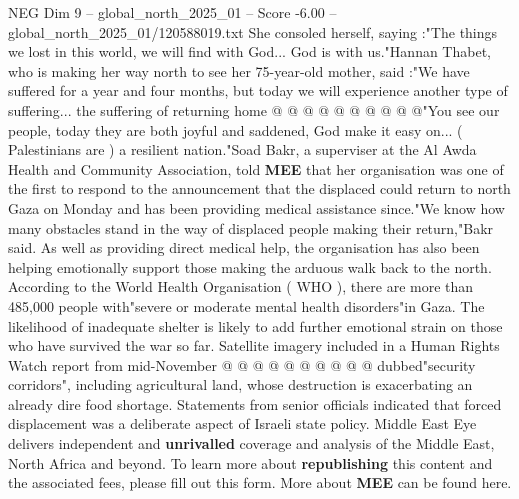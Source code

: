 \begin{textsample}{NEG Dim 9 – global\_north\_2025\_01 – Score -6.00 – global\_north\_2025\_01/120588019.txt}
She consoled herself, saying :"The things we lost in this world, we will find with God...
God is with us."Hannan Thabet, who is making her way north to see her 75-year-old mother, said :"We have suffered for a year and four months, but today we will experience another type of suffering... the suffering of returning home @ @ @ @ @ @ @ @ @ @"You see our people, today they are both joyful and saddened, God make it easy on... ( Palestinians are ) a resilient nation."Soad Bakr, a superviser at the Al Awda Health and Community Association, told \textbf{MEE} that her organisation was one of the first to respond to the announcement that the displaced could return to north Gaza on Monday and has been providing medical assistance since."We know how many obstacles stand in the way of displaced people making their return,"Bakr said.
As well as providing direct medical help, the organisation has also been helping emotionally support those making the arduous walk back to the north.
According to the World Health Organisation ( WHO ), there are more than 485,000 people with"severe or moderate mental health disorders"in Gaza.
The likelihood of inadequate shelter is likely to add further emotional strain on those who have survived the war so far.
Satellite imagery included in a Human Rights Watch report from mid-November @ @ @ @ @ @ @ @ @ @ dubbed"security corridors", including agricultural land, whose destruction is exacerbating an already dire food shortage.
Statements from senior officials indicated that forced displacement was a deliberate aspect of Israeli state policy.
Middle East Eye delivers independent and \textbf{unrivalled} coverage and analysis of the Middle East, North Africa and beyond.
To learn more about \textbf{republishing} this content and the associated fees, please fill out this form.
More about \textbf{MEE} can be found here.

\end{textsample}
